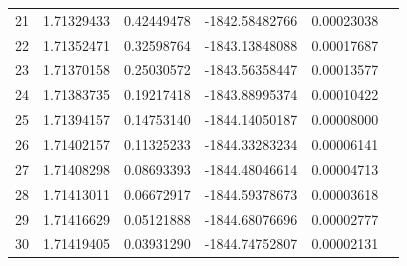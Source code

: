 \documentclass{article}
\begin{document}
\begin{table}[ht!]
\begin{tabular}{|c|c| c| c| c |c |}
21 & 1.71329433 & 0.42449478   & -1842.58482766 & 0.00023038 \\
22 & 1.71352471 & 0.32598764   & -1843.13848088 & 0.00017687 \\
23 & 1.71370158 & 0.25030572   & -1843.56358447 & 0.00013577 \\
24 & 1.71383735 & 0.19217418   & -1843.88995374 & 0.00010422 \\
25 & 1.71394157 & 0.14753140   & -1844.14050187 & 0.00008000 \\
26 & 1.71402157 & 0.11325233   & -1844.33283234 & 0.00006141 \\
27 & 1.71408298 & 0.08693393   & -1844.48046614 & 0.00004713 \\
28 & 1.71413011 & 0.06672917   & -1844.59378673 & 0.00003618 \\
29 & 1.71416629 & 0.05121888   & -1844.68076696 & 0.00002777 \\
30 & 1.71419405 & 0.03931290   & -1844.74752807 & 0.00002131 \\
        \hline
    \end{tabular}
    \end{table}
\end{document}
